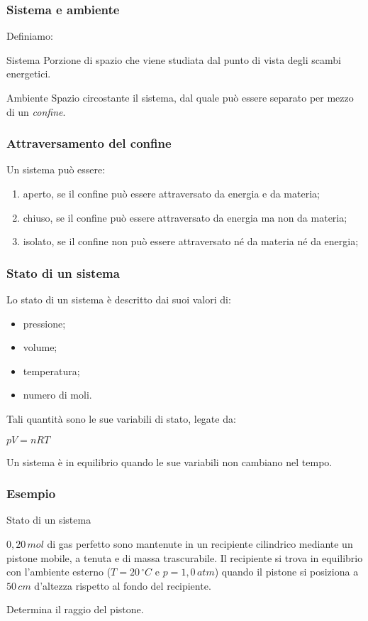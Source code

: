 \documentclass[]{beamer}
\theoremstyle{plain}
\begin{document}
\begin{frame}
\frametitle{Sistema e ambiente}
Definiamo:
\begin{block}{Sistema}
Porzione di spazio che viene studiata dal punto di vista degli scambi energetici.
\end{block}\pause
\begin{block}{Ambiente}
Spazio circostante il sistema, dal quale può essere separato per mezzo di un \emph{confine}.
\end{block}
\end{frame}

\begin{frame}
\frametitle{Attraversamento del confine}
Un sistema può essere:
\begin{enumerate}
  \item \alert<1>{aperto}, se il confine può essere attraversato da energia e da materia;\pause
  \item \alert<2>{chiuso}, se il confine può essere attraversato da energia ma non da materia;\pause
  \item \alert<3>{isolato}, se il confine non può essere attraversato né da materia né da energia;
\end{enumerate}
\end{frame}


\begin{frame}
\frametitle{Stato di un sistema}
Lo stato di un sistema è descritto dai suoi valori di:
\begin{itemize}
  \item pressione;
  \item volume;
  \item temperatura;
  \item numero di moli.
\end{itemize}\pause
Tali quantità sono le sue \alert<1>{variabili di stato}, legate da:
\begin{center}
$ pV = nRT $
\end{center}\pause
Un sistema è in equilibrio quando le sue variabili non cambiano nel tempo.
\end{frame}


\begin{frame}
\frametitle{Esempio}
\begin{exampleblock}{Stato di un sistema}
{\small
$ 0,20 \, mol $ di gas perfetto sono mantenute in un recipiente cilindrico mediante un pistone mobile, a tenuta e di massa trascurabile. Il recipiente si trova in equilibrio con l'ambiente esterno ($ T = 20 \, ^\circ C $ e $ p = 1,0 \, atm $) quando il pistone si posiziona a $ 50 \, cm $ d'altezza rispetto al fondo del recipiente.

Determina il raggio del pistone.}
\end{exampleblock}
\end{frame}
\end{document}
